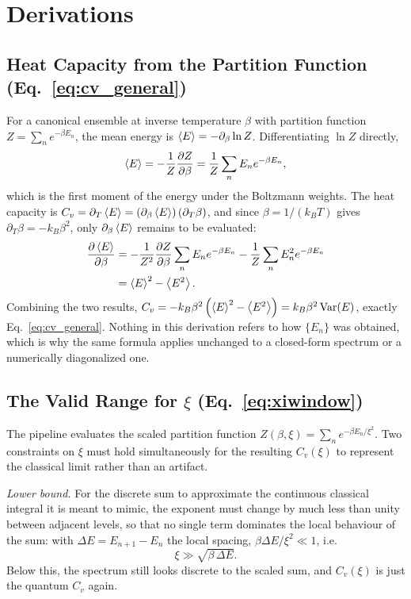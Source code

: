 \documentclass[10pt,conference]{IEEEtran}
\begin{document}
\appendix
\section{Derivations}
\label{sec:derivations}

\subsection{Heat Capacity from the Partition Function (Eq.~\ref{eq:cv_general})}
For a canonical ensemble at inverse temperature $\beta$ with partition function $Z=\sum_n e^{-\beta E_n}$, the mean energy is $\expval{E}=-\partial_\beta \ln Z$. Differentiating $\ln Z$ directly,
\begin{equation}
\expval{E} = -\frac{1}{Z}\frac{\partial Z}{\partial\beta} = \frac{1}{Z}\sum_n E_n e^{-\beta E_n},
\end{equation}
which is the first moment of the energy under the Boltzmann weights. The heat capacity is $C_v=\partial_T\expval{E}=\left(\partial_\beta\expval{E}\right)\left(\partial_T\beta\right)$, and since $\beta=1/(k_BT)$ gives $\partial_T\beta=-k_B\beta^2$, only $\partial_\beta\expval{E}$ remains to be evaluated:
\begin{equation}
\begin{aligned}
\frac{\partial\expval{E}}{\partial\beta} &= -\frac{1}{Z^2}\frac{\partial Z}{\partial\beta}\sum_n E_ne^{-\beta E_n} - \frac{1}{Z}\sum_n E_n^2 e^{-\beta E_n}\\
&= \expval{E}^2-\expval{E^2}.
\end{aligned}
\end{equation}
Combining the two results, $C_v = -k_B\beta^2\left(\expval{E}^2-\expval{E^2}\right) = k_B\beta^2\,\mathrm{Var}(E)$, exactly Eq.~\eqref{eq:cv_general}. Nothing in this derivation refers to how $\{E_n\}$ was obtained, which is why the same formula applies unchanged to a closed-form spectrum or a numerically diagonalized one.

\subsection{The Valid Range for $\xi$ (Eq.~\ref{eq:xiwindow})}
The pipeline evaluates the scaled partition function $Z(\beta,\xi)=\sum_n e^{-\beta E_n/\xi^2}$. Two constraints on $\xi$ must hold simultaneously for the resulting $C_v(\xi)$ to represent the classical limit rather than an artifact.

\emph{Lower bound.} For the discrete sum to approximate the continuous classical integral it is meant to mimic, the exponent must change by much less than unity between adjacent levels, so that no single term dominates the local behaviour of the sum: with $\Delta E=E_{n+1}-E_n$ the local spacing, $\beta\Delta E/\xi^2\ll1$, i.e.
\begin{equation}
\xi \gg \sqrt{\beta\,\Delta E}.
\end{equation}
Below this, the spectrum still looks discrete to the scaled sum, and $C_v(\xi)$ is just the quantum $C_v$ again.
\end{document}
